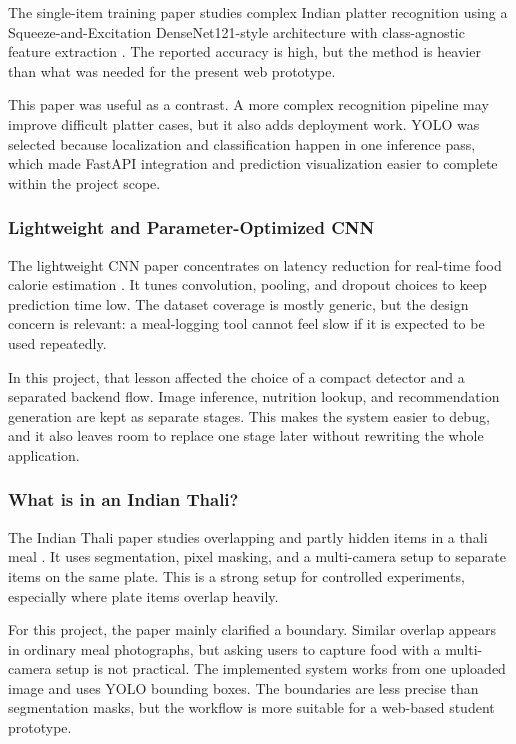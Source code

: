 The single-item training paper studies complex Indian platter recognition using a Squeeze-and-Excitation DenseNet121-style architecture with class-agnostic feature extraction \cite{sedensenet_multidish_2026}. The reported accuracy is high, but the method is heavier than what was needed for the present web prototype.

This paper was useful as a contrast. A more complex recognition pipeline may improve difficult platter cases, but it also adds deployment work. YOLO was selected because localization and classification happen in one inference pass, which made FastAPI integration and prediction visualization easier to complete within the project scope.

\subsubsection{Lightweight and Parameter-Optimized CNN}

The lightweight CNN paper concentrates on latency reduction for real-time food calorie estimation \cite{lightweight_cnn_food_2022}. It tunes convolution, pooling, and dropout choices to keep prediction time low. The dataset coverage is mostly generic, but the design concern is relevant: a meal-logging tool cannot feel slow if it is expected to be used repeatedly.

In this project, that lesson affected the choice of a compact detector and a separated backend flow. Image inference, nutrition lookup, and recommendation generation are kept as separate stages. This makes the system easier to debug, and it also leaves room to replace one stage later without rewriting the whole application.

\subsubsection{What is in an Indian Thali?}

The Indian Thali paper studies overlapping and partly hidden items in a thali meal \cite{indian_thali_2025}. It uses segmentation, pixel masking, and a multi-camera setup to separate items on the same plate. This is a strong setup for controlled experiments, especially where plate items overlap heavily.

For this project, the paper mainly clarified a boundary. Similar overlap appears in ordinary meal photographs, but asking users to capture food with a multi-camera setup is not practical. The implemented system works from one uploaded image and uses YOLO bounding boxes. The boundaries are less precise than segmentation masks, but the workflow is more suitable for a web-based student prototype.

